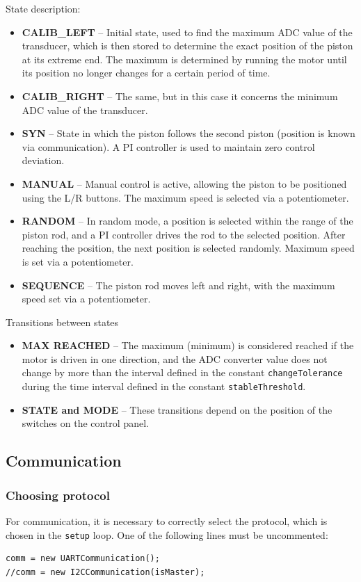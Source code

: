 State description:
\begin{itemize}
    \item \textbf{CALIB\_LEFT} – Initial state, used to find the maximum ADC value of the transducer, which is then stored to determine the exact position of the piston at its extreme end. The maximum is determined by running the motor until its position no longer changes for a certain period of time.
    \item \textbf{CALIB\_RIGHT} – The same, but in this case it concerns the minimum ADC value of the transducer.
    \item \textbf{SYN} – State in which the piston follows the second piston (position is known via communication). A PI controller is used to maintain zero control deviation.
    \item \textbf{MANUAL} – Manual control is active, allowing the piston to be positioned using the L/R buttons. The maximum speed is selected via a potentiometer.
    \item \textbf{RANDOM} – In random mode, a position is selected within the range of the piston rod, and a PI controller drives the rod to the selected position. After reaching the position, the next position is selected randomly. Maximum speed is set via a potentiometer.
    \item \textbf{SEQUENCE} – The piston rod moves left and right, with the maximum speed set via a potentiometer.
\end{itemize}

Transitions between states
\begin{itemize}
    \item \textbf{MAX REACHED} – The maximum (minimum) is considered reached if the motor is driven in one direction, 
    and the ADC converter value does not change by more than the interval defined in the 
    constant \texttt{changeTolerance} during the time interval defined in the constant 
    \texttt{stableThreshold}.
    \item \textbf{STATE and MODE} – These transitions depend on the position of the switches on the control panel.
\end{itemize}

\subsection{Communication}
\subsubsection{Choosing protocol}
For communication, it is necessary to correctly select the protocol, which is chosen in the \texttt{setup} loop.  
One of the following lines must be uncommented:
\begin{verbatim}
comm = new UARTCommunication();
//comm = new I2CCommunication(isMaster);
\end{verbatim}

